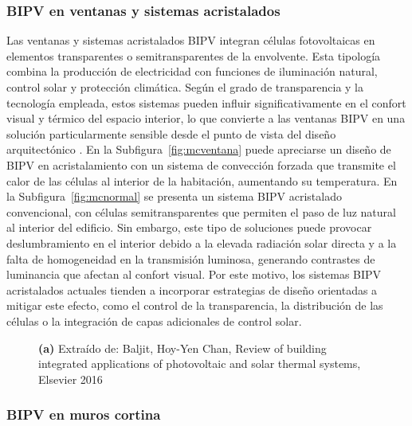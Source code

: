 \subsubsection{BIPV en ventanas y sistemas acristalados}

Las ventanas y sistemas acristalados BIPV integran células fotovoltaicas en elementos transparentes o semitransparentes de la envolvente. Esta tipología combina la producción de electricidad con funciones de iluminación natural, control solar y protección climática. Según el grado de transparencia y la tecnología empleada, estos sistemas pueden influir significativamente en el confort visual y térmico del espacio interior, lo que convierte a las ventanas BIPV en una solución particularmente sensible desde el punto de vista del diseño arquitectónico \cite{Baljit2016}. En la Subfigura~\ref{fig:mcventana} puede apreciarse un diseño de BIPV en acristalamiento con un sistema de convección forzada que transmite el calor de las células al interior de la habitación, aumentando su temperatura. En la Subfigura~\ref{fig:mcnormal} se presenta un sistema BIPV acristalado convencional, con células semitransparentes que permiten el paso de luz natural al interior del edificio. Sin embargo, este tipo de soluciones puede provocar deslumbramiento en el interior debido a la elevada radiación solar directa y a la falta de homogeneidad en la transmisión luminosa, generando contrastes de luminancia que afectan al confort visual. Por este motivo, los sistemas BIPV acristalados actuales tienden a incorporar estrategias de diseño orientadas a mitigar este efecto, como el control de la transparencia, la distribución de las células o la integración de capas adicionales de control solar.
  
\begin{figure}
	\centering
	\caption{\textbf{(a)} Extraído de: Baljit, Hoy-Yen Chan, Review of building integrated applications of photovoltaic and solar thermal systems, Elsevier 2016}
\end{figure}
\subsubsection{BIPV en muros cortina}

